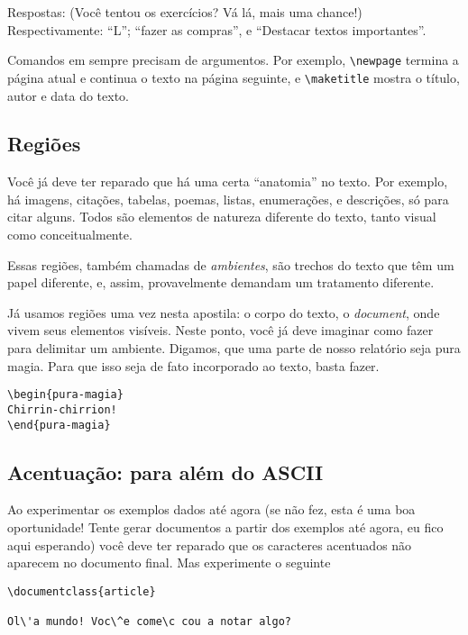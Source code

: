 Respostas: (Você tentou os exercícios? Vá lá, mais uma chance!)
Respectivamente: ``L''; ``fazer as compras'', e ``Destacar textos {importantes}''.

Comandos em sempre precisam de argumentos. Por exemplo,
\verb!\newpage! termina a página atual e continua o texto na página
seguinte, e \verb!\maketitle! mostra o título, autor e data do texto.

\subsection{Regiões}

Você já deve ter reparado que há uma certa ``anatomia'' no
texto. Por exemplo, há imagens, citações, tabelas, poemas, listas,
enumerações, e descrições, só para citar alguns. Todos são 
elementos de natureza diferente do texto, tanto visual como
conceitualmente.

Essas regiões, também chamadas de \emph{ambientes}, são trechos do
texto que têm um papel diferente, e, assim, provavelmente demandam um
tratamento diferente.

Já usamos regiões uma vez nesta apostila: o corpo do texto, o
\emph{document}, onde vivem seus elementos visíveis. Neste ponto, você
já deve imaginar como fazer para delimitar um ambiente. Digamos, que
uma parte de nosso relatório seja pura magia. Para que isso seja de
fato incorporado ao texto, basta fazer.

\begin{footnotesize}
\begin{verbatim}
\begin{pura-magia}
Chirrin-chirrion!
\end{pura-magia}
\end{verbatim}
\end{footnotesize}


\subsection{Acentuação: para além do ASCII}

Ao experimentar os exemplos dados até agora (se não fez, esta é uma
boa oportunidade! Tente gerar documentos a partir dos exemplos até
agora, eu fico aqui esperando) você deve ter reparado que os
caracteres acentuados não aparecem no documento final. Mas experimente
o seguinte
\begin{footnotesize}
\begin{verbatim}
\documentclass{article}

Ol\'a mundo! Voc\^e come\c cou a notar algo?

\end{verbatim}
\end{footnotesize}

